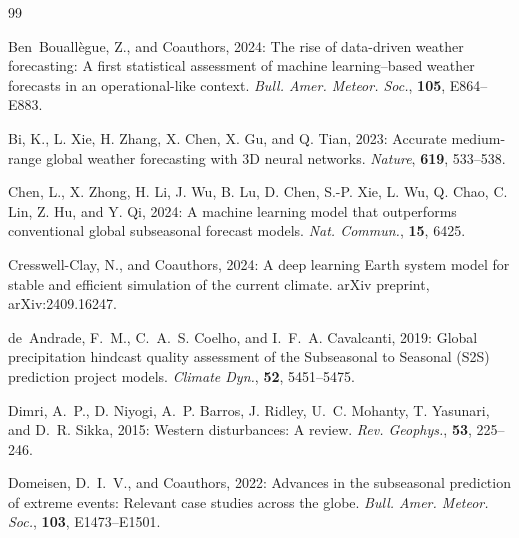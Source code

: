 \documentclass[11pt]{article}
\begin{document}
\begin{thebibliography}{99}

Ben~Bouall\`egue, Z., and Coauthors, 2024: The rise of data-driven
weather forecasting: A first statistical assessment of machine
learning--based weather forecasts in an operational-like context.
\textit{Bull. Amer. Meteor. Soc.}, \textbf{105}, E864--E883. %

Bi, K., L. Xie, H. Zhang, X. Chen, X. Gu, and Q. Tian, 2023: Accurate
medium-range global weather forecasting with 3D neural networks.
\textit{Nature}, \textbf{619}, 533--538.

Chen, L., X. Zhong, H. Li, J. Wu, B. Lu, D. Chen, S.-P. Xie, L. Wu,
Q. Chao, C. Lin, Z. Hu, and Y. Qi, 2024: A machine learning model
that outperforms conventional global subseasonal forecast models.
\textit{Nat. Commun.}, \textbf{15}, 6425. %

Cresswell-Clay, N., and Coauthors, 2024: A deep learning Earth system
model for stable and efficient simulation of the current climate.
arXiv preprint, arXiv:2409.16247. %

de~Andrade, F.~M., C.~A.~S. Coelho, and I.~F.~A. Cavalcanti, 2019:
Global precipitation hindcast quality assessment of the Subseasonal
to Seasonal (S2S) prediction project models. \textit{Climate Dyn.},
\textbf{52}, 5451--5475.

Dimri, A.~P., D. Niyogi, A.~P. Barros, J. Ridley, U.~C. Mohanty,
T. Yasunari, and D.~R. Sikka, 2015: Western disturbances: A review.
\textit{Rev. Geophys.}, \textbf{53}, 225--246.

Domeisen, D.~I.~V., and Coauthors, 2022: Advances in the subseasonal
prediction of extreme events: Relevant case studies across the globe.
\textit{Bull. Amer. Meteor. Soc.}, \textbf{103}, E1473--E1501. %


\end{thebibliography}
\end{document}
